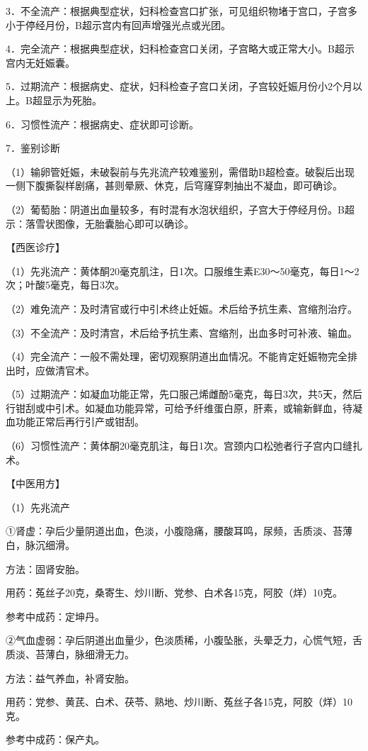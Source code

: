 \documentclass[12pt,UTF8]{ctexbook}
\begin{document}
3．不全流产：根据典型症状，妇科检查宫口扩张，可见组织物堵于宫口，子宫多小于停经月份，B超示宫内有回声增强光点或光团。

4．完全流产：根据典型症状，妇科检查宫口关闭，子宫略大或正常大小。B超示宫内无妊娠囊。

5．过期流产：根据病史、症状，妇科检查子宫口关闭，子宫较妊娠月份小2个月以上。B超显示为死胎。

6．习惯性流产：根据病史、症状即可诊断。

7．鉴别诊断

（1）输卵管妊娠，未破裂前与先兆流产较难鉴别，需借助B超检查。破裂后出现一侧下腹撕裂样剧痛，甚则晕厥、休克，后穹窿穿刺抽出不凝血，即可确诊。

（2）葡萄胎：阴道出血量较多，有时混有水泡状组织，子宫大于停经月份。B超示：落雪状图像，无胎囊胎心即可以确诊。

【西医诊疗】

（1）先兆流产：黄体酮20毫克肌注，日1次。口服维生素E30～50毫克，每日1～2次；叶酸5毫克，每日3次。

（2）难免流产：及时清官或行中引术终止妊娠。术后给予抗生素、宫缩剂治疗。

（3）不全流产：及时清宫，术后给予抗生素、宫缩剂，出血多时可补液、输血。

（4）完全流产：一般不需处理，密切观察阴道出血情况。不能肯定妊娠物完全排出时，应做清官术。

（5）过期流产：如凝血功能正常，先口服己烯雌酚5毫克，每日3次，共5天，然后行钳刮或中引术。如凝血功能异常，可给予纤维蛋白原，肝素，或输新鲜血，待凝血功能正常后再行引产或钳刮。

（6）习惯性流产：黄体酮20毫克肌注，每日1次。宫颈内口松弛者行子宫内口缝扎术。

【中医用方】

（1）先兆流产

①肾虚：孕后少量阴道出血，色淡，小腹隐痛，腰酸耳鸣，尿频，舌质淡、苔薄白，脉沉细滑。

方法：固肾安胎。

用药：菟丝子20克，桑寄生、炒川断、党参、白术各15克，阿胶（烊）10克。

参考中成药：定坤丹。

②气血虚弱：孕后阴道出血量少，色淡质稀，小腹坠胀，头晕乏力，心慌气短，舌质淡、苔薄白，脉细滑无力。

方法：益气养血，补肾安胎。

用药：党参、黄芪、白术、茯苓、熟地、炒川断、菟丝子各15克，阿胶（烊）10克。

参考中成药：保产丸。
\end{document}

